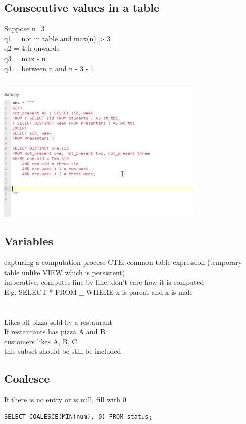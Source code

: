 \documentclass[11pt]{article}
\begin{document}
\subsection*{Consecutive values in a table}
Suppose n=3\\
q1 = not in table and max(n) > 3 \\
q2 = 4th onwards \\
q3 = max - n\\
q4 = between n and n - 3 - 1 \\
\\
\includegraphics[height=7cm]{images/s.png}
\subsection*{Variables}
capturing a computation process
CTE: common table expression (temporary table unlike VIEW which is persistent)
\\
imperative, computes line by line, don't care how it is computed\\
E.g. SELECT * FROM $\_\_$ WHERE x is parent and x is male \\
\\
\\
Likes all pizza sold by a restaurant\\
If restaurants has pizza A and B\\
customers likes A, B, C\\
this subset should be still be included
\subsection*{Coalesce}
If there is no entry or is null, fill with 0\\
\begin{verbatim}
SELECT COALESCE(MIN(num), 0) FROM status;	
\end{verbatim}
\end{document}
